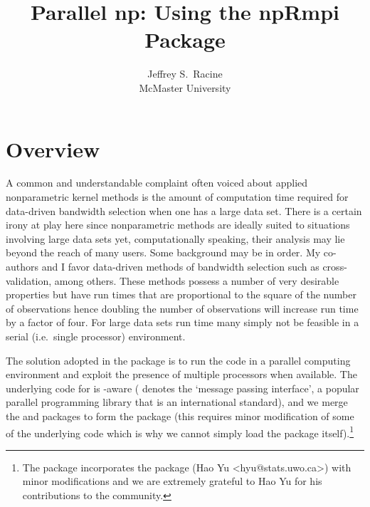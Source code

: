 \documentclass[nojss]{jss}
\author{Jeffrey S.~Racine\\McMaster University}
\title{Parallel np: Using the npRmpi Package}
\begin{document}





\section{Overview}

A common and understandable complaint often voiced about applied
nonparametric kernel methods is the amount of computation time
required for data-driven bandwidth selection when one has a large data
set. There is a certain irony at play here since nonparametric methods
are ideally suited to situations involving large data sets yet,
computationally speaking, their analysis may lie beyond the reach of
many users.  Some background may be in order. My co-authors and I
favor data-driven methods of bandwidth selection such as
cross-validation, among others. These methods possess a number of very
desirable properties but have run times that are proportional to the
square of the number of observations hence doubling the number of
observations will increase run time by a factor of four. For large
data sets run time many simply not be feasible in a serial
(i.e.~single processor) environment.

The solution adopted in the  package is to run the code in
a parallel computing environment and exploit the presence of multiple
processors when available. The underlying  code for 
is -aware ( denotes the `message passing
interface', a popular parallel programming library that is an
international standard), and we merge the  and 
packages to form the  package (this requires minor
modification of some of the underlying  code which is why we
cannot simply load the  package itself).\footnote{The
   package incorporates the  package (Hao Yu
  <hyu@stats.uwo.ca>) with minor modifications and we are extremely
  grateful to Hao Yu for his contributions to the 
  community.}
\end{document}
